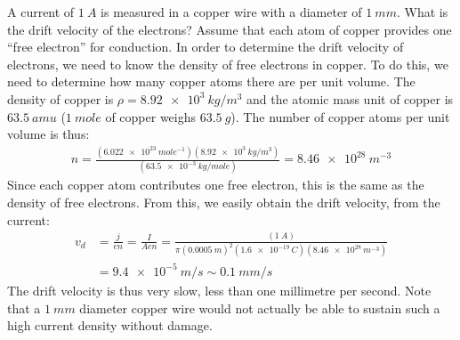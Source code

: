 \begin{example}{A current of $\SI{1}{A}$ is measured in a copper wire with a diameter of $\SI{1}{mm}$. What is the drift velocity of the electrons? Assume that each atom of copper provides one ``free electron'' for conduction.}
In order to determine the drift velocity of electrons, we need to know the density of free electrons in copper. To do this, we need to determine how many copper atoms there are per unit volume. The density of copper is $\rho=\SI{8.92e3}{kg/m^3}$ and the atomic mass unit of copper is $\SI{63.5}{amu}$ ($\SI{1}{mole}$ of copper weighs $\SI{63.5}{g}$). The number of copper atoms per unit volume is thus:
\begin{align*}
n=\frac{(\SI{6.022e23}{mole^{-1}})(\SI{8.92e3}{kg/m^3})}{(\SI{63.5e-3}{kg/mole})}=\SI{8.46e28}{m^{-3}}
\end{align*}
Since each copper atom contributes one free electron, this is the same as the density of free electrons. From this, we easily obtain the drift velocity, from the current:
\begin{align*}
v_d&=\frac{j}{en}=\frac{I}{Aen}=\frac{(\SI{1}{A})}{\pi(\SI{0.0005}{m})^2(\SI{1.6e-19}{C})(\SI{8.46e28}{m^{-3}})}\\
&=\SI{9.4e-5}{m/s}\sim\SI{0.1}{mm/s}
\end{align*}
The drift velocity is thus very slow, less than one millimetre per second. Note that a $\SI{1}{mm}$ diameter copper wire would not actually be able to sustain such a high current density without damage.
\end{example}
\newpage

